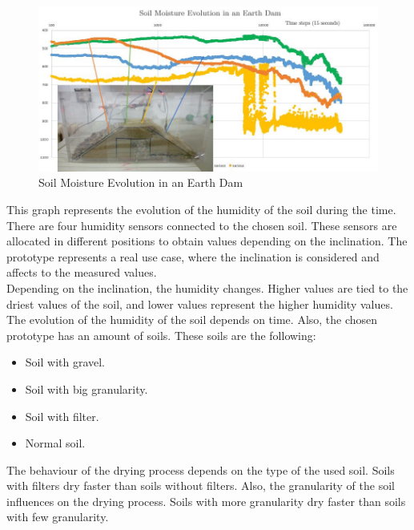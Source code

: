 \begin{figure}[H]
\begin{centering}
\includegraphics[scale=0.6]{IMGS/results_measures.jpeg}
\caption{Soil Moisture Evolution in an Earth Dam \label{Soil Moisture Evolution in an Earth Dam}}
\end{centering}
\end{figure} 

This graph represents the evolution of the humidity of the soil during the time. There are four humidity sensors connected to the chosen soil. These sensors are allocated in different positions to obtain values depending on the inclination. The prototype represents a real use case, where the inclination is considered and affects to the measured values.\\

Depending on the inclination, the humidity changes. Higher values are tied to the driest values of the soil, and lower values represent the higher humidity values. The evolution of the humidity of the soil depends on time. Also, the chosen prototype has an amount of soils. These soils are the following:\\

\begin{itemize}

\item Soil with gravel.
\item Soil with big granularity.
\item Soil with filter.
\item Normal soil.

\end{itemize}

The behaviour of the drying process depends on the type of the used soil. Soils with filters dry faster than soils without filters. Also, the granularity of the soil influences on the drying process. Soils with more granularity dry faster than soils with few granularity.\\

